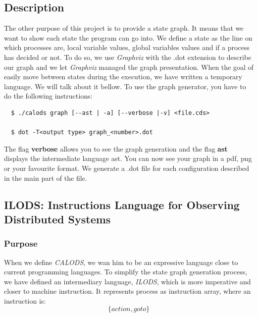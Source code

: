 \documentclass{article}
\begin{document}
\subsection{Description}
The other purpose of this project is to provide a state graph. It means that we want to show each state the program can go into. We define a state as the line on which processes are, local variable values, global variables values and if a process has decided or not. To do so, we use \textit{Graphviz} with the .dot extension to describe our graph and we let \textit{Graphviz} managed the graph presentation. When the goal of easily move between states during the execution, we have written a temporary language. We will talk about it bellow. To use the graph generator, you have to do the following instructions:
\begin{lstlisting}
  $ ./calods graph [--ast | -a] [--verbose |-v] <file.cds>
  
  $ dot -T<output type> graph_<number>.dot  
\end{lstlisting}
The flag \textbf{verbose} allows you to see the graph generation and the flag \textbf{ast} displays the intermediate language ast.
You can now see your graph in a pdf, png or your favourite format. We generate a .dot file for each configuration described in the main part of the file.



\subsection{ILODS: Instructions Language for Observing Distributed Systems}
\subsubsection{Purpose}
When we define \textit{CALODS}, we wan him to be an expressive language close to current programming languages. To simplify the state graph generation process, we have defined an intermediary language, \textit{ILODS}, which is more imperative and closer to machine instruction. It represents process as instruction array, where an instruction is:
  $$ \{action, goto\} $$

  
\end{document}
